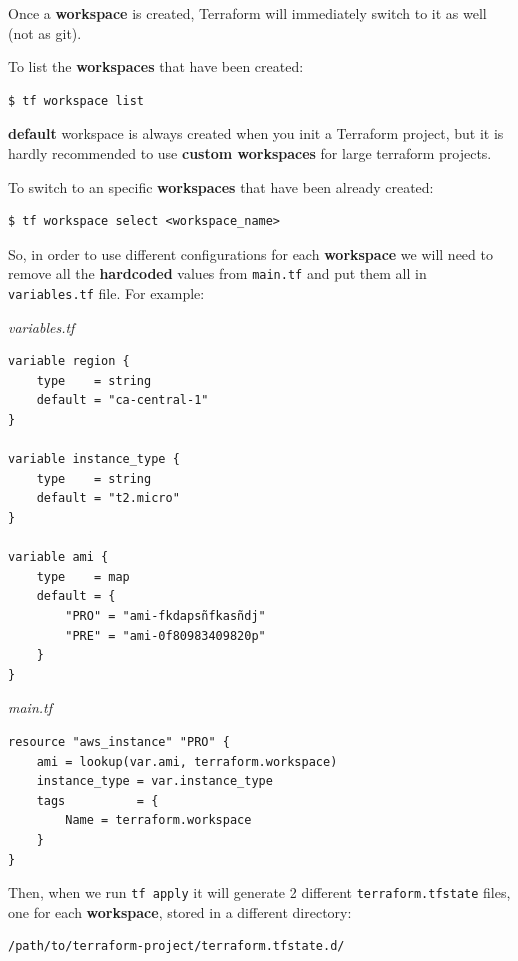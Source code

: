 \documentclass{article}
\newenvironment{blocktemplate}[1]{%
    \tcolorbox[beamer,%
    noparskip,breakable,
    colframe=Blue,%
    colbacklower=LimeGreen!75!LightGreen,%
    title=#1]}%
    {\endtcolorbox}
\newenvironment{blocktemplateII}[1]{%
    \tcolorbox[beamer,%
    noparskip,breakable,
    colframe=Green,%
    colbacklower=LimeGreen!75!LightGreen,%
    title=#1]}%
    {\endtcolorbox}
\newenvironment{codetemplate}[1][]{%
  \mybasecolorbox[#1]
  \itshape
}{%
  \endmybasecolorbox
}
\begin{document}
\begin{blocktemplate}{Note}
Once a \textbf{workspace} is created, Terraform will immediately switch to it as well (not as git).
\end{blocktemplate}

To list the \textbf{workspaces} that have been created:
\begin{codetemplate}{}
\begin{verbatim}
$ tf workspace list
\end{verbatim}
\end{codetemplate}

\begin{blocktemplateII}{Note}
\textbf{default} workspace is always created when you init a Terraform project, but it is hardly recommended to use \textbf{custom workspaces} for large terraform projects.
\end{blocktemplateII}

To switch to an specific \textbf{workspaces} that have been already created:
\begin{codetemplate}{}
\begin{verbatim}
$ tf workspace select <workspace_name>
\end{verbatim}
\end{codetemplate}

So, in order to use different configurations for each \textbf{workspace} we will need to remove all the \textbf{hardcoded} values from \verb|main.tf| and put them all in \verb|variables.tf| file. For example:

\begin{codetemplate}{variables.tf}
\begin{verbatim}
variable region {
    type    = string
    default = "ca-central-1" 
}

variable instance_type {
    type    = string
    default = "t2.micro"
}

variable ami {
    type    = map
    default = {
        "PRO" = "ami-fkdapsñfkasñdj"
        "PRE" = "ami-0f80983409820p"
    }
}
\end{verbatim}
\end{codetemplate}

\begin{codetemplate}{main.tf}
\begin{verbatim}
resource "aws_instance" "PRO" {
    ami = lookup(var.ami, terraform.workspace)
    instance_type = var.instance_type
    tags          = {
        Name = terraform.workspace
    }
}
\end{verbatim}
\end{codetemplate}

Then, when we run \verb|tf apply| it will generate 2 different \verb|terraform.tfstate| files, one for each \textbf{workspace}, stored in a different directory:
\begin{codetemplate}{}
\begin{verbatim}
/path/to/terraform-project/terraform.tfstate.d/
\end{verbatim}
\end{codetemplate}
\end{document}
